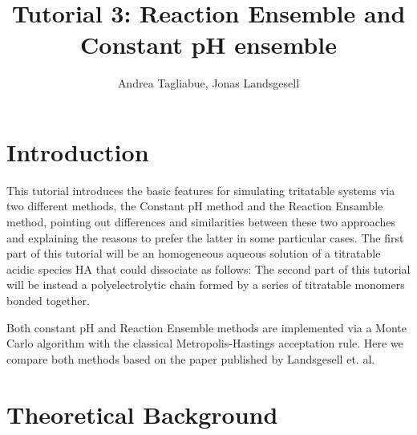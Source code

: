 \documentclass[
a4paper,                        %
11pt,                           %
twoside,                        %
footsepline,                    %
headsepline,                    %
headexclude,                    %
footexclude,                    %
pagesize,                       %
]{scrartcl}
\begin{document}
\title{Tutorial 3: Reaction Ensemble and Constant pH ensemble}
\author{Andrea Tagliabue, Jonas Landsgesell}

\maketitle
\tableofcontents

\section{Introduction}

This tutorial introduces the basic features for simulating tritatable systems via two different methods, the Constant pH method and the Reaction Ensamble method, pointing out differences and similarities between these two approaches and explaining the reasons to prefer the latter in some particular cases.
The first part of this tutorial will be an homogeneous aqueous solution of a titratable acidic species HA that could dissociate as follows:
The second part of this tutorial will be instead a polyelectrolytic chain formed by a series of titratable monomers bonded together.

\noindent Both constant pH and Reaction Ensemble methods are implemented via a Monte Carlo algorithm with the classical Metropolis-Hastings acceptation rule. Here we compare both methods based on the paper published by Landsgesell et. al\cite{landsgesell2017simulation}.

\section{Theoretical Background}
\end{document}
